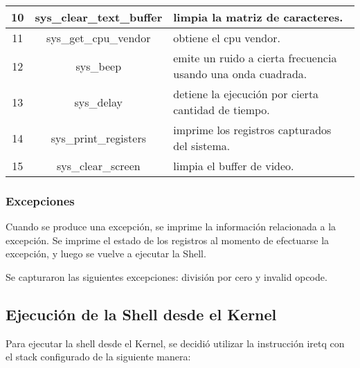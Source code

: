 \documentclass{article}
\begin{document}
\begin{center}
\begin{tabular}{|c|c|l|}
10 & sys\_clear\_text\_buffer &  \begin{minipage}{80mm}limpia la matriz de caracteres.\end{minipage} \\ \hline
11 & sys\_get\_cpu\_vendor &  \begin{minipage}{80mm}obtiene el cpu vendor. \end{minipage} \\ \hline
12 & sys\_beep &  \begin{minipage}{80mm}emite un ruido a cierta frecuencia usando una onda cuadrada.\end{minipage} \\ \hline
13 & sys\_delay &  \begin{minipage}{80mm}detiene la ejecución por cierta cantidad de tiempo.\end{minipage} \\ \hline
14 & sys\_print\_registers &  \begin{minipage}{80mm}imprime los registros capturados del sistema.\end{minipage} \\ \hline
15 & sys\_clear\_screen &  \begin{minipage}{80mm}limpia el buffer de video.\end{minipage} \\ \hline
\end{tabular}
\label{table:syscalls}
\end{center}

\subsubsection {Excepciones}

Cuando se produce una excepción, se imprime la información relacionada a la excepción. Se imprime el estado de los registros al momento de efectuarse la excepción, y luego se vuelve a ejecutar la Shell.

Se capturaron las siguientes excepciones: división por cero y invalid opcode.

\subsection {Ejecución de la Shell desde el Kernel}

Para ejecutar la shell desde el Kernel, se decidió utilizar la instrucción iretq con el stack configurado de la siguiente manera:
\end{document}
